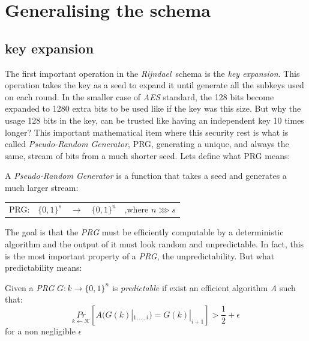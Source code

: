 \documentclass[10pt,a4paper,twoside]{llncs}
\newcommand{\rijndael}{\emph{Rijndael}}
\begin{document}
\section{Generalising the schema}\label{sec:generalising}

\subsection{key expansion}\label{sec:keyExpansion}
The first important operation in the \rijndael\, schema is the \emph{key expansion}. This operation takes the key as a seed to expand it until generate all the subkeys used on each round. In the smaller case of \emph{AES} standard, the 128 bits become expanded to 1280 extra bits to be used like if the key was this size. But why the usage 128 bits in the key, can be trusted like having an independent key 10 times longer? This important mathematical item where this security rest is what is called \emph{Pseudo-Random Generator}, PRG, generating a unique, and always the same, stream of bits from a much shorter seed. Lets define what PRG means:

\begin{definition}\label{def:PRG}
 A \emph{Pseudo-Random Generator} is a function that takes a seed and generates a much larger stream:
 \begin{center}
  \begin{tabular}{llllr}
   PRG: & $\{0,1\}^{s}$ & $\rightarrow$ & $\{0,1\}^n$ & ,where $n \ggg s$\\
  \end{tabular}
 \end{center}
 
\end{definition}
The goal is that the \emph{PRG} must be efficiently computable by a deterministic algorithm and the output of it must look random and unpredictable. In fact, this is the most important property of a \emph{PRG}, the unpredictability. But what predictability means:

\begin{definition}\label{def:unpredictability}
 Given a \emph{PRG} $G: k \rightarrow \{0,1\}^n$ is \emph{predictable} if exist an efficient algorithm \emph{A} such that:
 \begin{equation}
  \underset{k\leftarrow\mathcal{K}}{Pr}\left[A(G(k)|_{1,...,i}) = G(k)|_{i+1}\right]>\frac{1}{2}
+\epsilon \end{equation}
 for a non negligible $\epsilon$
\end{definition}
\end{document}
